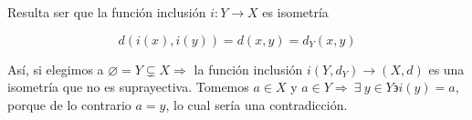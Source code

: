 \begin{remark}
    Resulta ser que la función inclusión $i : Y \to X$ es isometría

    \begin{equation*}
        d(i(x),i(y)) = d(x,y) = d_Y(x,y)
    \end{equation*}

    Así, si elegimos a $\varnothing = Y \subsetneq X \Rightarrow$ la función inclusión $i  (Y,d_Y) \to (X,d)$ es una isometría que no es suprayectiva. Tomemos $a \in X$ y $a \in Y \Rightarrow \: \exists \: y \in Y \backepsilon i(y) = a$, porque de lo contrario $a = y$, lo cual sería una contradicción. 
\end{remark}